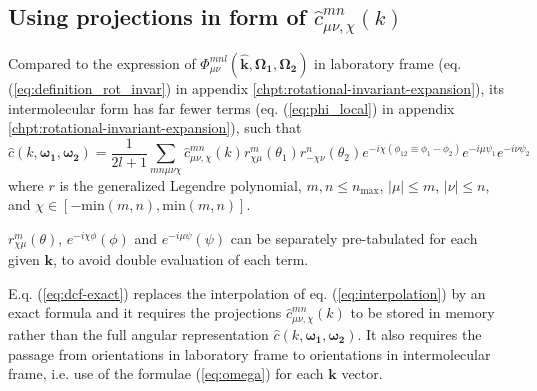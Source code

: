 \subsection{Using projections in form of $\hat{c}_{\mu\nu,\chi}^{mn}(k)$\label{subsec:Using-projections-in-1}}

Compared to the expression of $\Phi_{\mu\nu}^{mnl}(\mathbf{\hat{k}},\mathbf{\Omega_{1}},\mathbf{\Omega_{2}})$
in laboratory frame (eq. (\ref{eq:definition_rot_invar}) in appendix
\ref{chpt:rotational-invariant-expansion}), its intermolecular form
has far fewer terms (eq. (\ref{eq:phi_local}) in appendix \ref{chpt:rotational-invariant-expansion}),
such that
\begin{equation}
\hat{c}(k,\boldsymbol{\omega_{1}},\boldsymbol{\omega_{2}})=\frac{1}{2l+1}\sum_{mn\mu\nu\chi}\hat{c}_{\mu\nu,\chi}^{mn}(k)r_{\chi\mu}^{m}(\theta_{1})r_{-\chi\nu}^{n}(\theta_{2})e^{-i\chi(\phi_{12}\equiv\phi_{1}-\phi_{2})}e^{-i\mu\psi_{1}}e^{-i\nu\psi_{2}}\label{eq:dcf-exact}
\end{equation}
where $r$ is the generalized Legendre polynomial, $m,n\leq n{}_{\mathrm{max}}$,
$\left|\mu\right|\leq m$, $\left|\nu\right|\leq n$, and $\chi\in\left[-\mathrm{min}(m,n),\mathrm{min}(m,n)\right]$.

$r_{\chi\mu}^{m}(\theta)$, $e^{-i\chi\phi}(\phi)$ and $e^{-i\mu\psi}(\psi)$
can be separately pre-tabulated for each given $\mathbf{k}$, to avoid
double evaluation of each term.

E.q. (\ref{eq:dcf-exact}) replaces the interpolation of eq. (\ref{eq:interpolation})
by an exact formula and it requires the projections $\hat{c}_{\mu\nu,\chi}^{mn}(k)$
to be stored in memory rather than the full angular representation
$\hat{c}(k,\boldsymbol{\omega_{1}},\boldsymbol{\omega_{2}})$. It
also requires the passage from orientations in laboratory frame to
orientations in intermolecular frame, i.e. use of the formulae (\ref{eq:omega})
for each $\mathbf{k}$ vector.
